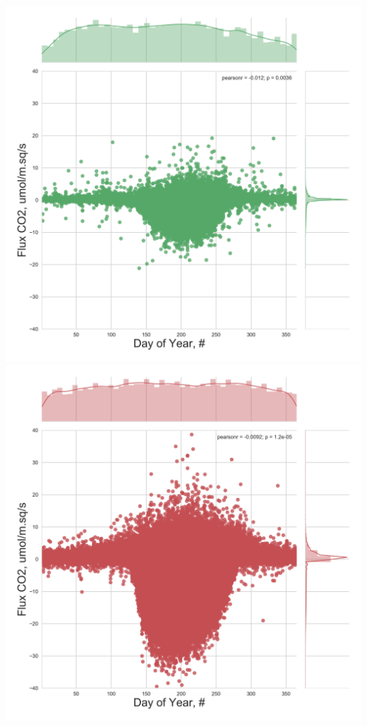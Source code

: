 \documentclass{beamer}
\begin{document}
\begin{frame}
\begin{columns}[t]
\includegraphics[width=\textwidth]{FvsY/CA-NS6.png}\\
\includegraphics[width=\textwidth]{FvsY/CA-Oas.png}

\end{columns}
\end{frame}
\end{document}
